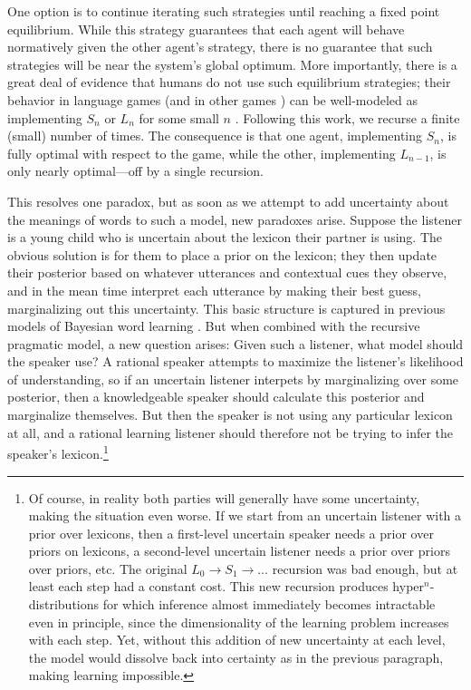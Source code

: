 \documentclass{article} %
\begin{document}
One option is to continue iterating such
strategies until reaching a fixed point equilibrium. While this
strategy guarantees that each agent will behave normatively given the
other agent's strategy, there is no guarantee that such strategies
will be near the system's global optimum. More importantly, there is a
great deal of
evidence that humans do not use such equilibrium strategies; their behavior in language
games (and in other games \cite{camerer2004}) can be well-modeled as
implementing $S_n$ or $L_n$ for some small $n$
\cite{frank2012}. Following this work, we recurse a finite (small)
number of times. The consequence is that one agent, implementing
$S_n$, is fully optimal with respect to the game, while the other,
implementing $L_{n-1}$, is only nearly optimal---off by a single
recursion.

This resolves one paradox, but as soon as we attempt to add uncertainty about the meanings of words
to such a model, new paradoxes arise. Suppose the listener is a young
child who is uncertain about the lexicon their partner is using. The
obvious solution is for them to place a prior on the lexicon; they
then update their posterior based on whatever utterances and
contextual cues they observe, and in the mean time interpret each
utterance by making their best guess, marginalizing out this
uncertainty. This basic structure is captured in previous models of
Bayesian word learning \cite{frank2009}. But when combined with the
recursive pragmatic model, a new question arises: Given such a
listener, what model should the speaker use? A rational speaker
attempts to maximize the listener's likelihood of understanding, so if
an uncertain listener interpets by marginalizing over some posterior,
then a knowledgeable speaker should calculate this posterior and
marginalize themselves. But then the speaker is not using any
particular lexicon at all, and a rational learning listener should
therefore not be trying to infer the speaker's lexicon.\footnote{Of
  course, in reality both parties will generally have some
  uncertainty, making the situation even worse. If we start from an
  uncertain listener with a prior over lexicons, then a first-level
  uncertain speaker needs a prior over priors on lexicons, a
  second-level uncertain listener needs a prior over priors over
  priors, etc. The original $L_0 \rightarrow S_1 \rightarrow \dots$
  recursion was bad enough, but at least each step had a constant
  cost. This new recursion produces hyper$^n$-distributions for which
  inference almost immediately becomes intractable even in principle,
  since the dimensionality of the learning problem increases with each
  step. Yet, without this addition of new uncertainty at each level,
  the model would dissolve back into certainty as in the previous
  paragraph, making learning
  impossible.}
\end{document}
